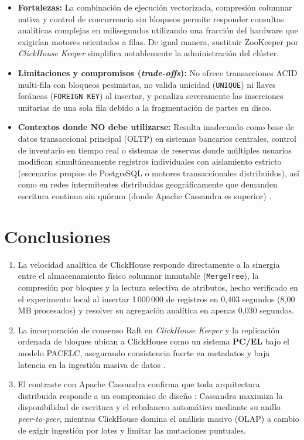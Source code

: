 \documentclass[12pt,a4paper]{article}
\begin{document}
\begin{itemize}[leftmargin=1.2cm]
    \item \textbf{Fortalezas:} La combinación de ejecución vectorizada, compresión columnar nativa y control de concurrencia sin bloqueos permite responder consultas analíticas complejas en milisegundos utilizando una fracción del hardware que exigirían motores orientados a filas. De igual manera, sustituir ZooKeeper por \textit{ClickHouse Keeper} simplifica notablemente la administración del clúster.
    \item \textbf{Limitaciones y compromisos (\textit{trade-offs}):} No ofrece transacciones ACID multi-fila con bloqueos pesimistas, no valida unicidad (\texttt{UNIQUE}) ni llaves foráneas (\texttt{FOREIGN KEY}) al insertar, y penaliza severamente las inserciones unitarias de una sola fila debido a la fragmentación de partes en disco.
    \item \textbf{Contextos donde NO debe utilizarse:} Resulta inadecuado como base de datos transaccional principal (OLTP) en sistemas bancarios centrales, control de inventario en tiempo real o sistemas de reservas donde múltiples usuarios modifican simultáneamente registros individuales con aislamiento estricto (escenarios propios de PostgreSQL o motores transaccionales distribuidos), así como en redes intermitentes distribuidas geográficamente que demanden escritura continua sin quórum (donde Apache Cassandra es superior) \cite{newman2021building, habib2024architecture}.
\end{itemize}

\section{Conclusiones}
\begin{enumerate}[leftmargin=1.2cm]
    \item La velocidad analítica de ClickHouse responde directamente a la sinergia entre el almacenamiento físico columnar inmutable (\texttt{MergeTree}), la compresión por bloques y la lectura selectiva de atributos, hecho verificado en el experimento local al insertar 1\,000\,000 de registros en 0,403 segundos (8,00\,MB procesados) y resolver su agregación analítica en apenas 0,030 segundos.
    \item La incorporación de consenso Raft en \textit{ClickHouse Keeper} y la replicación ordenada de bloques ubican a ClickHouse como un sistema \textbf{PC/EL} bajo el modelo PACELC, asegurando consistencia fuerte en metadatos y baja latencia en la ingestión masiva de datos \cite{han2024palf, vansteen2023distributed}.
    \item El contraste con Apache Cassandra confirma que toda arquitectura distribuida responde a un compromiso de diseño \cite{habib2024architecture}: Cassandra maximiza la disponibilidad de escritura y el rebalanceo automático mediante su anillo \textit{peer-to-peer}, mientras ClickHouse domina el análisis masivo (OLAP) a cambio de exigir ingestión por lotes y limitar las mutaciones puntuales.
\end{enumerate}
\end{document}
